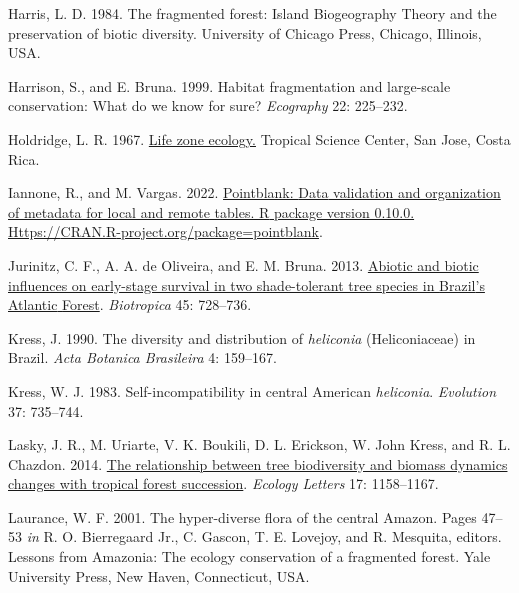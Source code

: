\documentclass[
  12pt,
  man, donotrepeattitle,floatsintext]{apa6}
\newlength{\cslhangindent}
\newlength{\cslentryspacingunit} %
\newenvironment{CSLReferences}[2] %
 {%
  \setlength{\parindent}{0pt}
  \ifodd #1
  \let\oldpar\par
  \def\par{\hangindent=\cslhangindent\oldpar}
  \fi
  \setlength{\parskip}{#2\cslentryspacingunit}
 }%
 {}
\begin{document}
\begin{CSLReferences}{1}{0}
\leavevmode{}%
Harris, L. D. 1984. The fragmented forest: {Island} {Biogeography} {Theory} and the preservation of biotic diversity. University of Chicago Press, Chicago, Illinois, USA.

\leavevmode{}%
Harrison, S., and E. Bruna. 1999. Habitat fragmentation and large-scale conservation: What do we know for sure? \emph{Ecography} 22: 225--232.

\leavevmode{}%
Holdridge, L. R. 1967. \href{https://www.cabdirect.org/cabdirect/abstract/19670604180}{Life zone ecology.} Tropical Science Center, San Jose, Costa Rica.

\leavevmode{}%
Iannone, R., and M. Vargas. 2022. \href{https://CRAN.R-project.org/package=pointblank}{Pointblank: {Data} validation and organization of metadata for local and remote tables. {R} package version 0.10.0. Https://{CRAN}.{R}-project.org/package=pointblank}.

\leavevmode{}%
Jurinitz, C. F., A. A. de Oliveira, and E. M. Bruna. 2013. \href{https://doi.org/10.1111/btp.12058}{Abiotic and biotic influences on early-stage survival in two shade-tolerant tree species in {Brazil}'s {Atlantic} {Forest}}. \emph{Biotropica} 45: 728--736.

\leavevmode{}%
Kress, J. 1990. The diversity and distribution of \emph{heliconia} ({Heliconiaceae}) in {Brazil}. \emph{Acta Botanica Brasileira} 4: 159--167.

\leavevmode{}%
Kress, W. J. 1983. Self-incompatibility in central {American} \emph{heliconia}. \emph{Evolution} 37: 735--744.

\leavevmode{}%
Lasky, J. R., M. Uriarte, V. K. Boukili, D. L. Erickson, W. John Kress, and R. L. Chazdon. 2014. \href{https://doi.org/10.1111/ele.12322}{The relationship between tree biodiversity and biomass dynamics changes with tropical forest succession}. \emph{Ecology Letters} 17: 1158--1167.

\leavevmode{}%
Laurance, W. F. 2001. The hyper-diverse flora of the central {Amazon}. Pages 47--53 \emph{in} R. O. Bierregaard Jr., C. Gascon, T. E. Lovejoy, and R. Mesquita, editors. Lessons from {Amazonia}: {The} ecology conservation of a fragmented forest. Yale University Press, New Haven, Connecticut, USA.


\end{CSLReferences}
\end{document}
